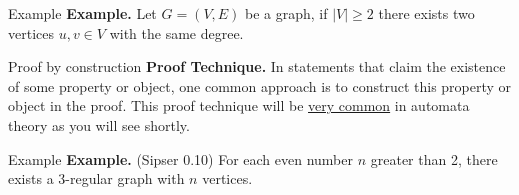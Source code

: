 \documentclass[10pt]{beamer}
\begin{document}
\begin{frame}[t]{Example}
    \textbf{Example.} Let $G = (V, E)$ be a graph, if $|V| \geq 2$ there exists two vertices $u, v \in V$ with the same degree.
\end{frame}

\begin{frame}{Proof by construction}
    \textbf{Proof Technique.} In statements that claim the existence of some property or object, one common approach is to construct this property or object in the proof. This proof technique will be \underline{very common} in automata theory as you will see shortly.
\end{frame}

\begin{frame}[t]{Example}
    \textbf{Example.} (Sipser 0.10) For each even number $n$ greater than 2, there exists a 3-regular graph with $n$ vertices.
\end{frame}
\end{document}
